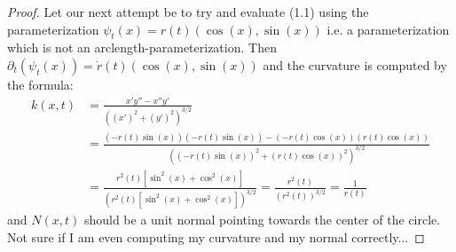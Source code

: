 \documentclass{article}
\begin{document}
\begin{proof}
    Let our next attempt be to try and evaluate (1.1) using the parameterization $\psi_t(x) = r(t)(\cos(x),\sin(x))$ i.e. a parameterization which is not an arclength-parameterization.
    Then $\partial_t(\psi_t(x)) = \dot{r}(t)(\cos(x),\sin(x))$ and the curvature is computed by the formula:
    \begin{align*}
    	k(x,t) &= \frac{x'y''-x''y'}{((x')^2+(y')^2)^{3/2}} \\
		&= \frac{(-r(t)\sin(x))(-r(t)\sin(x)) - (-r(t)\cos(x))(r(t)\cos(x))}{((-r(t)\sin(x))^2+(r(t)\cos(x))^2)^{3/2}} \\
		&= \frac{r^2(t)[\sin^2(x) + \cos^2(x)]}{(r^2(t)[\sin^2(x)+\cos^2(x)])^{3/2}} = \frac{r^2(t)}{(r^2(t))^{3/2}} = \frac{1}{r(t)}
    \end{align*}
    and $N(x,t)$ should be a unit normal pointing towards the center of the circle. Not sure if I am even computing my curvature and my normal correctly...
\end{proof}
\end{document}
